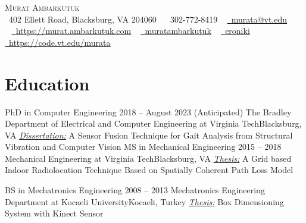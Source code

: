 \documentclass[letterpaper,11pt]{article}
\begin{document}
\nocite{ambarkutuk2022sensor}
\nocite{ambarkutuk2021uncertainty}
\nocite{sa2021investigation}
\nocite{sa2020towards}
\nocite{ambarkutuk2017grid}
\nocite{ocak2015image}
\nocite{guner2015meslek}
\nocite{guner2014distance}
\nocite{guner2013magnetic}

\begin{center}
    {\Huge \scshape Murat Ambarkutuk} \\ \vspace{1pt}
    \faHome~402 Ellett Road, Blacksburg, VA 204060
	~ \small \raisebox{-0.1\height}\faPhone\ 302-772-8419
	~ \href{mailto:murata@vt.edu}{\raisebox{-0.2\height}\faEnvelope\  \underline{murata@vt.edu}} \\
	~ \href{https://murat.ambarkutuk.com}{\raisebox{-0.2\height}\faBookmark\  \underline{https://murat.ambarkutuk.com}} 
    ~ \href{https://linkedin.com/in/muratambarkutuk/}{\raisebox{-0.2\height}\faLinkedin\ \underline{muratambarkutuk}}
	~ \href{https://github.com/eroniki}{\raisebox{-0.2\height}\faGithub\ \underline{eroniki}}
	~ \href{https://code.vt.edu/murata}{\raisebox{-0.2\height}\faGitlab\ \underline{https://code.vt.edu/murata}}
	\vspace{-8pt}
\end{center}

\section{Education}
  \resumeSubHeadingListStart
    \resumeSubheading
      {PhD in Computer Engineering}
	  {2018 -- August 2023 (Anticipated)}
      {The Bradley Department of Electrical and Computer Engineering at Virginia Tech}{Blacksburg, VA}
	  \textit{\underline{Dissertation:}} A Sensor Fusion Technique for Gait Analysis from Structural Vibration and Computer Vision 
	  \resumeSubheading
      {MS in Mechanical Engineering}
	  {2015 -- 2018}
      {Mechanical Engineering at Virginia Tech}{Blacksburg, VA}
	  \textit{\underline{Thesis:}} A Grid based Indoor Radiolocation Technique Based on Spatially Coherent Path Loss Model
	  
	  \resumeSubheading
      {BS in Mechatronics Engineering}
	  {2008 -- 2013}
      {Mechatronics Engineering Department at Kocaeli University}{Kocaeli, Turkey}
	  \textit{\underline{Thesis:}} Box Dimensioning System with Kinect Sensor
  \resumeSubHeadingListEnd
\end{document}
